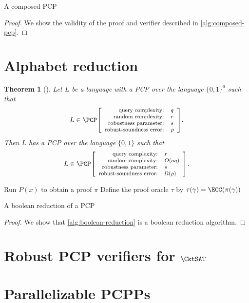 \documentclass[english,12pt]{reedthesis}
\theoremstyle{plain}
\newtheorem{thm}{Theorem}[section]
\theoremstyle{definition}
\theoremstyle{remark}
\newcommand{\pcpr}[4]{%
  \ensuremath%
  \mleft[{\footnotesize\begin{array}{r l}
    \text{query complexity:} & #1 \\
    \text{random complexity:} & #2 \\
    \text{robustness parameter:} & #3 \\
    \text{robust-soundness error:} & #4
  \end{array}}\mright]%
}
\begin{document}
\begin{algorithm}[htbp]
  \caption{A composed PCP~\cite[Theorem 2.7]{BGHSV06}}\label{alg:composed-pcp}
\end{algorithm}

\begin{proof}
  We show the validity of the proof and verifier described in
  \cref{alg:composed-pcp}.
\end{proof}


\section{Alphabet reduction}\label{sec:alph-reduction}

\begin{thm}[{\cite[Lemma 2.13]{BGHSV06}}]%
  \label{thm:alph-reduction}
  Let $L$ be a language with a PCP over the language $\{0, 1\}^{a}$ such
  that
  \[
    L \in \PCP\pcpr{q}{r}{s}{\rho}.
  \]
  Then $L$ has a PCP over the language $\{0, 1\}$ such that
  \[
    L \in \PCP\pcpr{r}{O(aq)}{s}{\Omega(\rho)}.
  \]
\end{thm}

\begin{algorithm}[htbp]
  Run $P(x)$ to obtain a proof $\pi$\;
  Define the proof oracle $\tau$ by $\tau(\gamma) = \ECC(\pi(\gamma))$\;
  \KwRet{$(\pi, \tau)$}\;
  \caption{A boolean reduction of a PCP~\cite[Construction 3.6]{GOS25}}\label{alg:boolean-reduction}
\end{algorithm}

\begin{proof}
  We show that \cref{alg:boolean-reduction} is a boolean reduction algorithm.
\end{proof}

\section{Robust PCP verifiers for $\CktSAT$}\label{sec:robust-pcp-cktsat}


\section{Parallelizable PCPPs}\label{sec:parallel-pcp}
\end{document}
